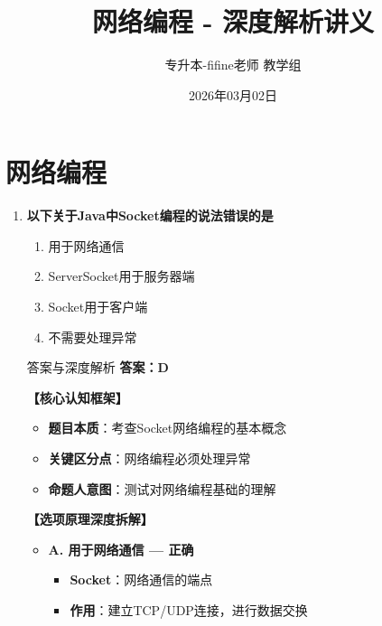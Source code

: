 \documentclass[12pt, a4paper]{ctexart}
\title{\textcolor{myblue}{\textbf{网络编程 - 深度解析讲义}}}
\author{专升本-fifine老师 教学组}
\date{2026年03月02日}
\begin{document}
\maketitle
\thispagestyle{empty}
\newpage

\section{网络编程}

\begin{enumerate}[label=\textbf{\arabic*.}]

	\item \textbf{以下关于Java中Socket编程的说法错误的是}
	      \begin{enumerate}[label=\Alph*.]
		      \item 用于网络通信
		      \item ServerSocket用于服务器端
		      \item Socket用于客户端
		      \item 不需要处理异常
	      \end{enumerate}

	      \begin{bluebox}{答案与深度解析}
		      \textbf{答案：D}

		      \textbf{【核心认知框架】}
		      \begin{itemize}[label={}, leftmargin=*, nosep]
			      \item \textbf{题目本质}：考查Socket网络编程的基本概念
			      \item \textbf{关键区分点}：网络编程必须处理异常
			      \item \textbf{命题人意图}：测试对网络编程基础的理解
		      \end{itemize}

		      \textbf{【选项原理深度拆解】}
					  \begin{itemize}[label={}, leftmargin=*, nosep]

		      \item \textbf{A. 用于网络通信 — 正确}
		      \begin{itemize}[label={}, leftmargin=*, nosep]
			      \item \textbf{Socket}：网络通信的端点
			      \item \textbf{作用}：建立TCP/UDP连接，进行数据交换
		      \end{itemize}


\end{itemize}
\end{bluebox}
\end{enumerate}
\end{document}
